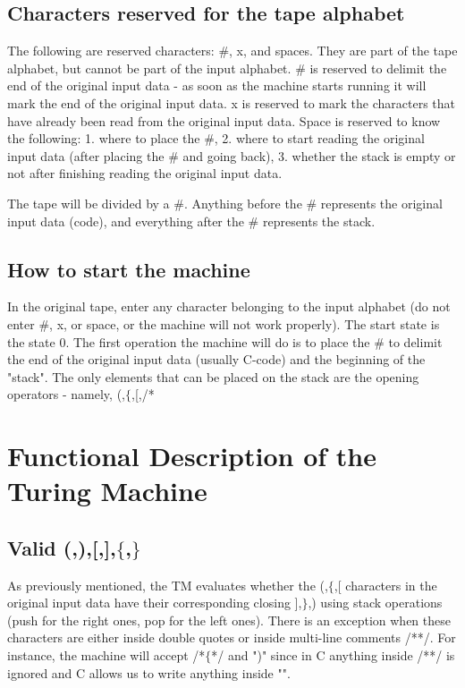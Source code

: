 \documentclass{article}
\begin{document}
\subsection{Characters reserved for the tape alphabet}
The following are reserved characters: $\#$, x, and spaces. They are part of the tape alphabet, but cannot be part of the 
input alphabet. $\#$ is reserved to delimit the end of the original input data - as soon as the machine starts running it will mark the 
end of the original input data. x is reserved to mark the characters that have already been read from the original input data. 
Space is reserved to know the following: 1. where to place the $\#$, 2. where to start reading the original input data (after placing 
the $\#$ and going back), 3. whether the stack is empty or not after finishing reading the original input data.

The tape will be divided by a $\#$. Anything before the $\#$ represents the original input data (code), and everything after the 
# represents the stack. 

\subsection{How to start the machine}
In the original tape, enter any character belonging to the input alphabet (do not enter #, x, or space, or the machine will not work properly). 
The start state is the state 0. The first operation the machine will do is to place the $\#$ to delimit the end of the 
original input data (usually C-code) and the beginning of the "stack". The only elements that can be placed on the stack are the opening 
operators - namely, (,$\{$,[,/* 

\section{Functional Description of the Turing Machine}

\subsection{Valid (,),[,],$\{$,$\}$}
As previously mentioned, the TM evaluates whether the (,$\{$,[ characters in the original input data have their corresponding closing ],$\}$,) using stack operations (push for the right ones, pop for the left ones). 
There is an exception when these characters are either inside double quotes or inside  multi-line comments /**/. For instance, the machine will 
accept /*$\{$*/ and ")" since in C anything inside /**/ is ignored and C allows us to write anything inside "".
\end{document}
